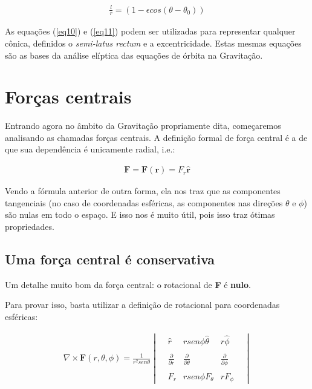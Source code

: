 \begin{eqnarray}
	\frac{l}{r}=(1-\epsilon cos(\theta - \theta_0)) \label{eq11}
\end{eqnarray}

As equações (\ref{eq10}) e (\ref{eq11}) podem ser utilizadas para representar qualquer cônica, definidos o \textit{semi-latus rectum} e a excentricidade. Estas mesmas equações são as bases da análise elíptica das equações de órbita na Gravitação.

\section{Forças centrais}

Entrando agora no âmbito da Gravitação propriamente dita, começaremos analisando as chamadas forças centrais. A definição formal de força central é a de que sua dependência é unicamente radial, i.e.:

\begin{eqnarray}
	\mathbf{F} =\mathbf{F}(\mathbf{r}) = F_r \mathbf{\hat{r}} \label{eq12}
\end{eqnarray}

Vendo a fórmula anterior de outra forma, ela nos traz que as componentes tangenciais (no caso de coordenadas esféricas, as componentes nas direções $\theta$ e $\phi$) são nulas em todo o espaço. E isso nos é muito útil, pois isso traz ótimas propriedades.

\subsection{Uma força central é conservativa}

Um detalhe muito bom da força central: o rotacional de \textbf{F} é \textbf{nulo}. {\\}

Para provar isso, basta utilizar a definição de rotacional para coordenadas esféricas:

\begin{eqnarray}
	\nabla \times \textbf{F} (r,\theta,\phi) = \frac{1}{r^2sen\theta} \begin{vmatrix} & \hat{r} &rsen\phi\hat{\theta} &  r\hat{\phi} & \\ \\ & \frac{\partial}{\partial r} & \frac{\partial}{\partial \theta} & \frac{\partial}{\partial \phi} & \\ \\ & F_r & rsen\phi F_{\theta} & rF_{\phi} & \end{vmatrix} \label{eq13}	
\end{eqnarray}

